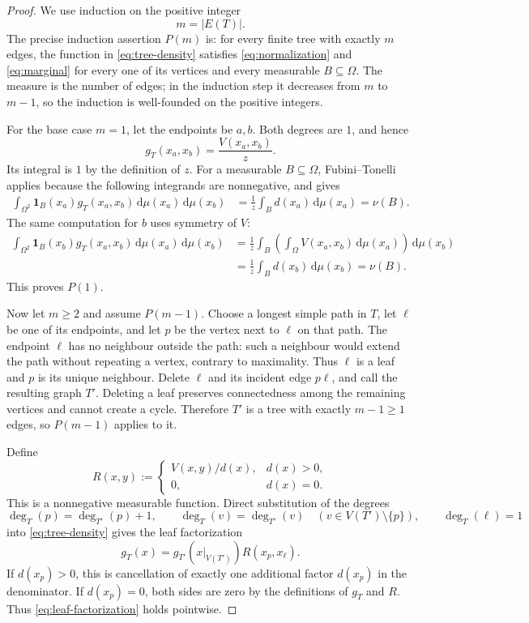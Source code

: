 \documentclass[11pt]{article}
\newcommand{\dd}{\,\mathrm{d}}
\newcommand{\one}{\mathbf{1}}
\begin{document}
\begin{proof}
We use induction on the positive integer
\[
m=|E(T)|.
\]
The precise induction assertion $P(m)$ is: for every finite tree with
exactly $m$ edges, the function in \eqref{eq:tree-density} satisfies
\eqref{eq:normalization} and \eqref{eq:marginal} for every one of its
vertices and every measurable $B\subseteq\Omega$.  The measure is the
number of edges; in the induction step it decreases from $m$ to $m-1$,
so the induction is well-founded on the positive integers.

For the base case $m=1$, let the endpoints be $a,b$.  Both degrees are
$1$, and hence
\[
g_T(x_a,x_b)=\frac{V(x_a,x_b)}{z}.
\]
Its integral is $1$ by the definition of $z$.  For a measurable
$B\subseteq\Omega$, Fubini--Tonelli applies because the following
integrands are nonnegative, and gives
\begin{align*}
\int_{\Omega^2}\one_B(x_a)g_T(x_a,x_b)
\dd\mu(x_a)\dd\mu(x_b)
&=\frac1z\int_B d(x_a)\dd\mu(x_a)
=\nu(B).
\end{align*}
The same computation for $b$ uses symmetry of $V$:
\begin{align*}
\int_{\Omega^2}\one_B(x_b)g_T(x_a,x_b)
\dd\mu(x_a)\dd\mu(x_b)
&=\frac1z\int_B
\left(\int_\Omega V(x_a,x_b)\dd\mu(x_a)\right)\dd\mu(x_b)
\\
&=\frac1z\int_B d(x_b)\dd\mu(x_b)
=\nu(B).
\end{align*}
This proves $P(1)$.

Now let $m\geq2$ and assume $P(m-1)$.  Choose a longest simple path in
$T$, let $\ell$ be one of its endpoints, and let $p$ be the vertex next
to $\ell$ on that path.  The endpoint $\ell$ has no neighbour outside
the path: such a neighbour would extend the path without repeating a
vertex, contrary to maximality.  Thus $\ell$ is a leaf and $p$ is its
unique neighbour.  Delete $\ell$ and its incident edge $p\ell$, and
call the resulting graph $T'$.  Deleting a leaf preserves connectedness
among the remaining vertices and cannot create a cycle.  Therefore
$T'$ is a tree with exactly $m-1\geq1$ edges, so $P(m-1)$ applies to it.

Define
\begin{equation}
R(x,y):=
\begin{cases}
V(x,y)/d(x),&d(x)>0,\\
0,&d(x)=0.
\end{cases}
\label{eq:transition-density}
\end{equation}
This is a nonnegative measurable function.  Direct substitution of
the degrees
\[
\deg_T(p)=\deg_{T'}(p)+1,
\qquad
\deg_T(v)=\deg_{T'}(v)\quad(v\in V(T')\setminus\{p\}),
\qquad
\deg_T(\ell)=1
\]
into \eqref{eq:tree-density} gives the leaf factorization
\begin{equation}
g_T(x)=g_{T'}(x|_{V(T')})R(x_p,x_\ell).
\label{eq:leaf-factorization}
\end{equation}
If $d(x_p)>0$, this is cancellation of exactly one additional factor
$d(x_p)$ in the denominator.  If $d(x_p)=0$, both sides are zero by
the definitions of $g_T$ and $R$.  Thus \eqref{eq:leaf-factorization}
holds pointwise.


\end{proof}
\end{document}
